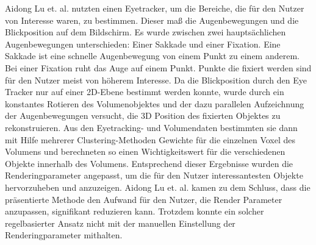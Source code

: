 Aidong Lu et. al. nutzten einen Eyetracker, um die Bereiche, die für den Nutzer von Interesse waren, zu bestimmen.
Dieser maß die Augenbewegungen und die Blickposition auf dem Bildschirm.
Es wurde zwischen zwei hauptsächlichen Augenbewegungen unterschieden: Einer Sakkade und einer Fixation.
Eine Sakkade ist eine schnelle Augenbewegung von einem Punkt zu einem anderem.
Bei einer Fixation ruht das Auge auf einem Punkt.
Punkte die fixiert werden sind für den Nutzer meist von höherem Interesse.
Da die Blickposition durch den Eye Tracker nur auf einer 2D-Ebene bestimmt werden konnte, wurde durch ein konstantes Rotieren des Volumenobjektes und der dazu parallelen Aufzeichnung der Augenbewegungen versucht, die 3D Position des fixierten Objektes zu rekonstruieren.
Aus den Eyetracking- und Volumendaten bestimmten sie dann mit Hilfe mehrerer Clustering-Methoden Gewichte für die einzelnen Voxel des Volumens und berechneten so einen Wichtigkeitswert für die verschiedenen Objekte innerhalb des Volumens.
Entsprechend dieser Ergebnisse wurden die Renderingparameter angepasst, um die für den Nutzer interessantesten Objekte hervorzuheben und anzuzeigen.
Aidong Lu et. al. kamen zu dem Schluss, dass die präsentierte Methode den Aufwand für den Nutzer, die Render Parameter anzupassen, signifikant reduzieren kann.
Trotzdem konnte ein solcher regelbasierter Ansatz nicht mit der manuellen Einstellung der Renderingparameter mithalten.


